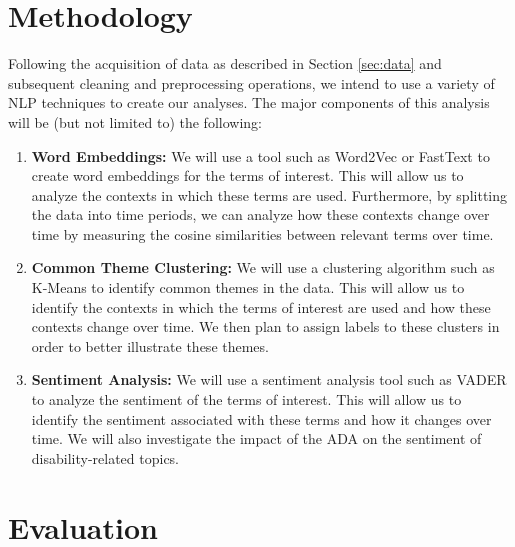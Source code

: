 \documentclass[letterpaper, twoside]{article}
\begin{document}
\section{Methodology}
Following the acquisition of data as described in Section \ref{sec:data} and subsequent cleaning and preprocessing operations, we intend to use a variety of NLP techniques to create our analyses. The major components of this analysis will be (but not limited to) the following:

\begin{enumerate}
    \item \textbf{Word Embeddings: }We will use a tool such as Word2Vec or FastText to create word embeddings for the terms of interest. This will allow us to analyze the contexts in which these terms are used. Furthermore, by splitting the data into time periods, we can analyze how these contexts change over time by measuring the cosine similarities between relevant terms over time.
    \item \textbf{Common Theme Clustering: }We will use a clustering algorithm such as K-Means to identify common themes in the data. This will allow us to identify the contexts in which the terms of interest are used and how these contexts change over time. We then plan to assign labels to these clusters in order to better illustrate these themes.
    \item \textbf{Sentiment Analysis: }We will use a sentiment analysis tool such as VADER to analyze the sentiment of the terms of interest. This will allow us to identify the sentiment associated with these terms and how it changes over time. We will also investigate the impact of the ADA on the sentiment of disability-related topics.
\end{enumerate}
\section{Evaluation}
\newpage
\printbibliography
\end{document}
